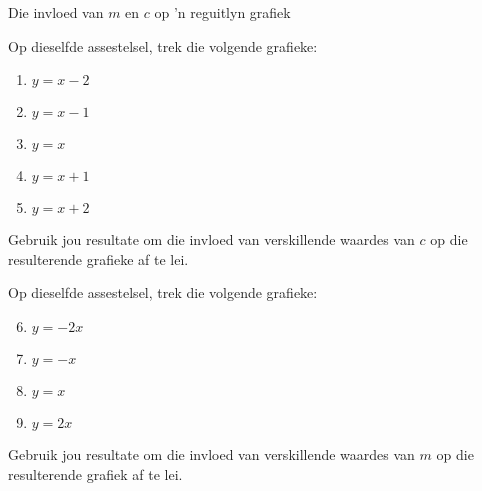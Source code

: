 \begin{Investigation}{Die invloed van $m$ en $c$ op 'n reguitlyn grafiek}

Op dieselfde assestelsel, trek die volgende grafieke:
\begin{enumerate}[noitemsep, label=\textbf{\arabic*}. ] 
\item $y=x-2$
\item $y=x-1$
\item $y=x$
\item $y=x+1$
\item $y=x+2$
\end{enumerate}
Gebruik jou resultate om die invloed van verskillende waardes van $c$ op die resulterende grafieke af te lei.\\
\par

Op dieselfde assestelsel, trek die volgende grafieke:
\begin{enumerate}[noitemsep, label=\textbf{\arabic*}. ] \setcounter{enumi}{5}
\item $y=-2x$
\item $y=-x$
\item $y=x$
\item $y=2x$
\end{enumerate}
Gebruik jou resultate om die invloed van verskillende waardes van $m$ op die resulterende grafiek af te lei.
\end{Investigation}


